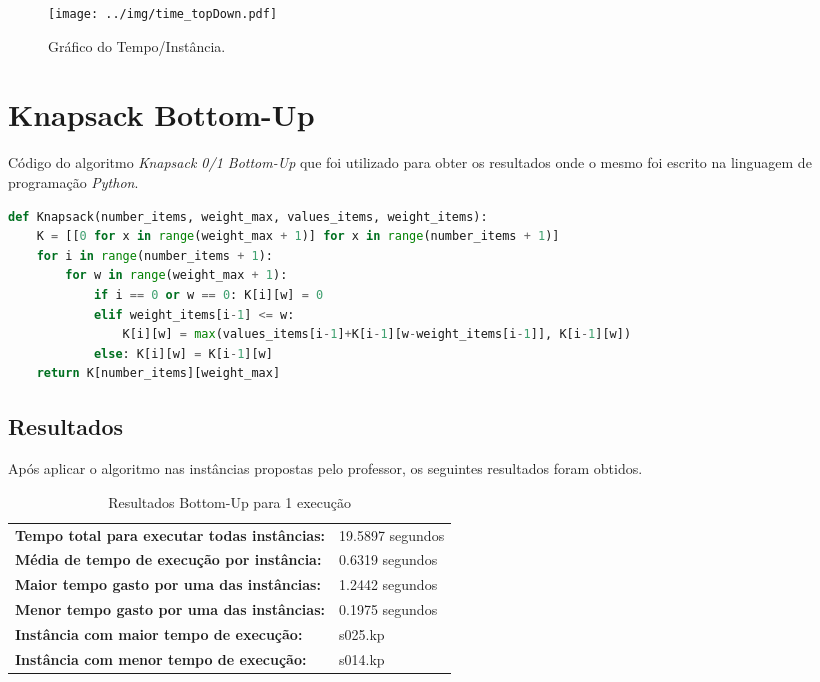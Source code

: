 \documentclass[a4paper, 12pt]{article}
\begin{document}
\begin{figure}[!htb]
    \centering
    \texttt{[image: ../img/time\_topDown.pdf]}
    \caption{Gráfico do Tempo/Instância.}
    \label{fig:time_topDown}
\end{figure}

\clearpage
\section{Knapsack Bottom-Up}\label{sec:bottomup}
Código do algoritmo {\it Knapsack 0/1 Bottom-Up} que foi utilizado para obter os resultados onde o mesmo foi escrito
na linguagem de programação {\it Python}.\\
\begin{lstlisting}[language=Python, caption=Bottom-Up, label=alg:bottomup]
def Knapsack(number_items, weight_max, values_items, weight_items): 
    K = [[0 for x in range(weight_max + 1)] for x in range(number_items + 1)]
    for i in range(number_items + 1): 
        for w in range(weight_max + 1): 
            if i == 0 or w == 0: K[i][w] = 0
            elif weight_items[i-1] <= w: 
                K[i][w] = max(values_items[i-1]+K[i-1][w-weight_items[i-1]], K[i-1][w]) 
            else: K[i][w] = K[i-1][w] 
    return K[number_items][weight_max]
\end{lstlisting}

\subsection{Resultados}

Após aplicar o algoritmo  nas instâncias propostas pelo professor, os seguintes resultados
foram obtidos.
\begin{table}[!htb]
    \begin{tabular}{ll}
    \textbf{Tempo total para executar todas instâncias:} & 19.5897 segundos \\
    \textbf{Média de tempo de execução por instância:} & 0.6319 segundos \\
    \textbf{Maior tempo gasto por uma das instâncias:} & 1.2442 segundos \\
    \textbf{Menor tempo gasto por uma das instâncias:} & 0.1975 segundos \\
    \textbf{Instância com maior tempo de execução:} & s025.kp \\
    \textbf{Instância com menor tempo de execução:} & s014.kp
    \end{tabular}
    \caption{Resultados Bottom-Up para 1 execução}
    \label{tab:bottomup_exec}
\end{table}
\end{document}

